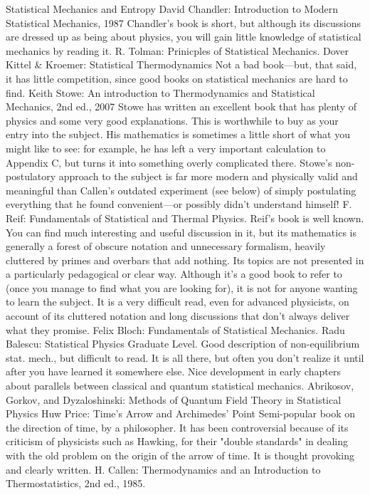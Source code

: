 \documentclass[10pt,a4paper]{book}
\theoremstyle{definition}
\begin{document}
Statistical Mechanics and Entropy
David Chandler: Introduction to Modern Statistical Mechanics, 1987
Chandler's book is short, but although its discussions are dressed up as being about physics, you will gain little knowledge of statistical mechanics by reading it.
R. Tolman: Prinicples of Statistical Mechanics. Dover
Kittel \& Kroemer: Statistical Thermodynamics
Not a bad book—but, that said, it has little competition, since good books on statistical mechanics are hard to find.
Keith Stowe: An introduction to Thermodynamics and Statistical Mechanics, 2nd ed., 2007
Stowe has written an excellent book that has plenty of physics and some very good explanations.  This is worthwhile to buy as your entry into the subject.  His mathematics is sometimes a little short of what you might like to see: for example, he has left a very important calculation to Appendix C, but turns it into something overly complicated there.  Stowe's non-postulatory approach to the subject is far more modern and physically valid and meaningful than Callen's outdated experiment (see below) of simply postulating everything that he found convenient—or possibly didn't understand himself!
F. Reif: Fundamentals of Statistical and Thermal Physics.
Reif's book is well known.  You can find much interesting and useful discussion in it, but its mathematics is generally a forest of obscure notation and unnecessary formalism, heavily cluttered by primes and overbars that add nothing.  Its topics are not presented in a particularly pedagogical or clear way.  Although it's a good book to refer to (once you manage to find what you are looking for), it is not for anyone wanting to learn the subject.  It is a very difficult read, even for advanced physicists, on account of its cluttered notation and long discussions that don't always deliver what they promise.
Felix Bloch: Fundamentals of Statistical Mechanics.
Radu Balescu: Statistical Physics
Graduate Level.  Good description of non-equilibrium stat. mech., but difficult to read.  It is all there, but often you don't realize it until after you have learned it somewhere else.  Nice development in early chapters about parallels between classical and quantum statistical mechanics.
Abrikosov, Gorkov, and Dyzaloshinski: Methods of Quantum Field Theory in Statistical Physics
Huw Price: Time's Arrow and Archimedes' Point
Semi-popular book on the direction of time, by a philosopher.  It has been controversial because of its criticism of physicists such as Hawking, for their "double standards" in dealing with the old problem on the origin of the arrow of time.  It is thought provoking and clearly written.
H. Callen: Thermodynamics and an Introduction to Thermostatistics, 2nd ed., 1985.
\end{document}
